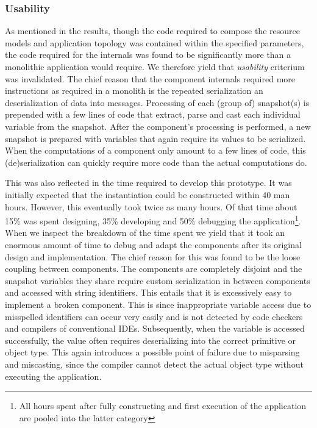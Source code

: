 \subsubsection{Usability}
As mentioned in the results, though the code required to compose the resource models and application topology was contained within the specified parameters, the code required for the internals was found to be significantly more than a monolithic application would require. We therefore yield that \emph{usability} criterium was invalidated. The chief reason that the component internals required  more instructions as required in a monolith is the repeated serialization an deserialization of data into messages. Processing of each (group of) snapshot(s) is prepended with a few lines of code that extract, parse and cast each individual variable from the snapshot. After the component's processing is performed, a new snapshot is prepared with variables that again require its values to be serialized. When the computations of a component only amount to a few lines of code, this (de)serialization can quickly require more code than the actual computations do.

This was also reflected in the time required to develop this prototype. It was initially expected that the instantiation could be constructed within 40 man hours. However, this eventually took twice as many hours. Of that time about 15\% was spent designing, 35\% developing and 50\% debugging the application\footnote{All hours spent after fully constructing and first execution of the application are pooled into the latter category}. When we inspect the breakdown of the time spent we yield that it took an enormous amount of time to debug and adapt the components after its original design and implementation. The chief reason for this was found to be the loose coupling between components. The components are completely disjoint and the snapshot variables they share require custom serialization in between components and accessed with string identifiers. This entails that it is excessively easy to implement a broken component. This is since inappropriate variable access due to misspelled identifiers can occur very easily and is not detected by code checkers and compilers of conventional IDEs. Subsequently, when the variable is accessed successfully, the value often requires deserializing into the correct primitive or object type. This again introduces a possible point of failure due to misparsing and miscasting, since the compiler cannot detect the actual object type without executing the application.

